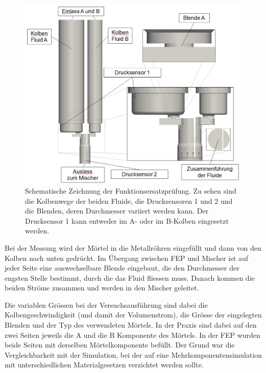 \begin{figure}
    \centering
    \includegraphics[width=\textwidth]{figures/FEP_Schema.png}
    \caption{Schematische Zeichnung der Funktionsersatzprüfung. Zu sehen sind die Kolbenwege der beiden Fluide,
    die Drucksensoren 1 und 2 und die Blenden, deren Durchmesser variiert werden kann. Der Drucksensor 1 kann entweder im A- oder im B-Kolben eingesetzt werden.}
    \label{fig:FEP_schema}
\end{figure}

Bei der Messung wird der Mörtel in die Metallröhren eingefüllt und dann von den Kolben nach unten gedrückt. Im Übergang zwischen FEP und Mischer ist auf jeder Seite eine auswechselbare Blende eingebaut, die den Durchmesser der engsten Stelle bestimmt, durch die das Fluid fliessen muss. Danach kommen die beiden Ströme zusammen und werden in den Mischer geleitet.

Die variablen Grössen bei der Versuchsausführung sind dabei die Kolbengeschwindigkeit (und damit der Volumenstrom), die Grösse der eingelegten Blenden und der Typ des verwendeten Mörtels. In der Praxis sind dabei auf den zwei Seiten jeweils die A und die B Komponente des Mörtels.
In der FEP wurden beide Seiten mit derselben Mörtelkomponente befüllt. Der Grund war die Vergleichbarkeit mit der Simulation, bei der auf eine Mehrkomponentensimulation mit unterschiedlichen Materialgesetzen verzichtet werden sollte.

